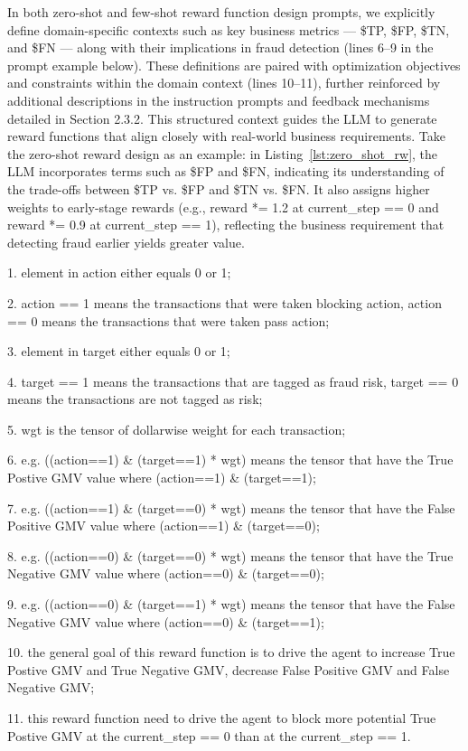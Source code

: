 \documentclass[11pt]{article}
\begin{document}
In both zero-shot and few-shot reward function design prompts, we explicitly define domain-specific contexts such as key business metrics — \$TP, \$FP, \$TN, and \$FN — along with their implications in fraud detection (lines 6–9 in the prompt example below). These definitions are paired with optimization objectives and constraints within the domain context (lines 10–11), further reinforced by additional descriptions in the instruction prompts and feedback mechanisms detailed in Section 2.3.2. This structured context guides the LLM to generate reward functions that align closely with real-world business requirements. Take the zero-shot reward design as an example: in Listing~\ref{lst:zero_shot_rw}, the LLM incorporates terms such as \$FP and \$FN, indicating its understanding of the trade-offs between \$TP vs. \$FP and \$TN vs. \$FN. It also assigns higher weights to early-stage rewards (e.g., reward *= 1.2 at current\_step == 0 and reward *= 0.9 at current\_step == 1), reflecting the business requirement that detecting fraud earlier yields greater value.

\begin{tcolorbox}[title=Domain-Specific Context Prompts for Reward Function Design, colframe=gray, colback=white, breakable,fonttitle=\large\bfseries, fontupper=\small]

1. element in action either equals 0 or 1;

2. action == 1 means the transactions that were taken blocking action, action == 0 means the transactions that were taken pass action;

3. element in target either equals 0 or 1;

4. target == 1 means the transactions that are tagged as fraud risk, target == 0 means the transactions are not tagged as risk;

5. wgt is the tensor of dollarwise weight for each transaction;

6. e.g. ((action==1) \& (target==1) * wgt) means the tensor that have the True Postive GMV value where (action==1) \& (target==1); 

7. e.g. ((action==1) \& (target==0) * wgt) means the tensor that have the False Positive GMV value where (action==1) \& (target==0);

8. e.g. ((action==0) \& (target==0) * wgt) means the tensor that have the True Negative GMV value where (action==0) \& (target==0);

9. e.g. ((action==0) \& (target==1) * wgt) means the tensor that have the False Negative GMV value where (action==0) \& (target==1);

10. the general goal of this reward function is to drive the agent to increase True Postive GMV and True Negative GMV, decrease False Positive GMV and False Negative GMV;

11. this reward function need to drive the agent to block more potential True Postive GMV at the current\_step == 0 than at the current\_step == 1.
\end{tcolorbox}
\end{document}
